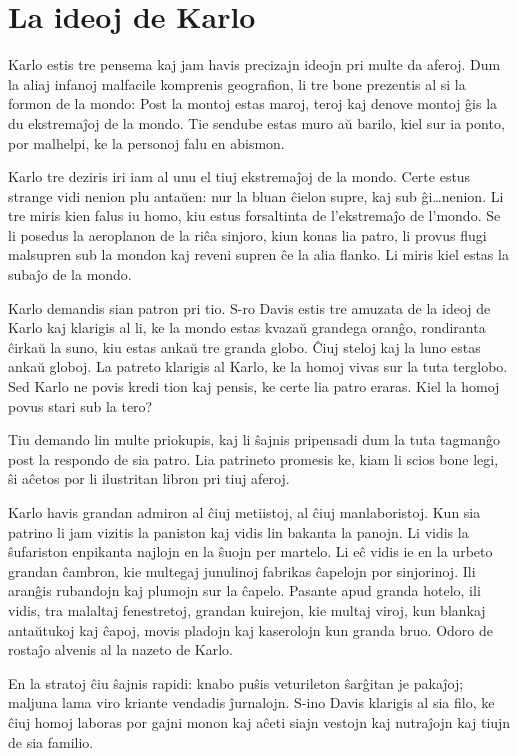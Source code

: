 \chapter{La ideoj de Karlo}

Karlo estis tre pensema kaj jam havis precizajn ideojn pri multe da aferoj. Dum la aliaj infanoj malfacile komprenis geografion, li tre bone prezentis al si la formon de la mondo: Post la montoj estas maroj, teroj kaj denove montoj ĝis la du ekstremaĵoj de la mondo. Tie sendube estas muro aŭ barilo, kiel sur ia ponto, por malhelpi, ke la personoj falu en abismon.

Karlo tre deziris iri iam al unu el tiuj ekstremaĵoj de la mondo. Certe estus strange vidi nenion plu antaŭen: nur la bluan ĉielon supre, kaj sub ĝi\ldots{}nenion. Li tre miris kien falus iu homo, kiu estus forsaltinta de l'ekstremaĵo de l'mondo. Se li posedus la aeroplanon de la riĉa sinjoro, kiun konas lia patro, li provus flugi malsupren sub la mondon kaj reveni supren ĉe la alia flanko. Li miris kiel estas la subaĵo de la mondo.

Karlo demandis sian patron pri tio. S-ro Davis estis tre amuzata de la ideoj de Karlo kaj klarigis al li, ke la mondo estas kvazaŭ grandega oranĝo, rondiranta ĉirkaŭ la suno, kiu estas ankaŭ tre granda globo. Ĉiuj steloj kaj la luno estas ankaŭ globoj. La patreto klarigis al Karlo, ke la homoj vivas sur la tuta terglobo. Sed Karlo ne povis kredi tion kaj pensis, ke certe lia patro eraras. Kiel la homoj povus stari sub la tero?

Tiu demando lin multe priokupis, kaj li ŝajnis pripensadi dum la tuta tagmanĝo post la respondo de sia patro. Lia patrineto promesis ke, kiam li scios bone legi, ŝi aĉetos por li ilustritan libron pri tiuj aferoj.

Karlo havis grandan admiron al ĉiuj metiistoj, al ĉiuj manlaboristoj. Kun sia patrino li jam vizitis la paniston kaj vidis lin bakanta la panojn. Li vidis la ŝufariston enpikanta najlojn en la ŝuojn per martelo. Li eĉ vidis ie en la urbeto grandan ĉambron, kie multegaj junulinoj fabrikas ĉapelojn por sinjorinoj. Ili aranĝis rubandojn kaj plumojn sur la ĉapelo. Pasante apud granda hotelo, ili vidis, tra malaltaj fenestretoj, grandan kuirejon, kie multaj viroj, kun blankaj antaŭtukoj kaj ĉapoj, movis pladojn kaj kaserolojn kun granda bruo. Odoro de rostaĵo alvenis al la nazeto de Karlo.

En la stratoj ĉiu ŝajnis rapidi: knabo puŝis veturileton ŝarĝitan je pakaĵoj; maljuna lama viro kriante vendadis ĵurnalojn. S-ino Davis klarigis al sia filo, ke ĉiuj homoj laboras por gajni monon kaj aĉeti siajn vestojn kaj nutraĵojn kaj tiujn de sia familio.

